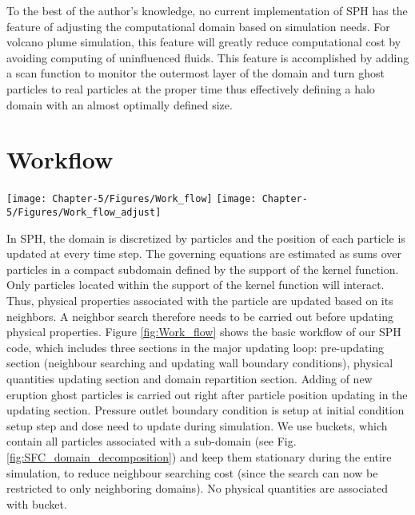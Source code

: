 To the best of the author's knowledge, no current implementation of SPH has the feature of adjusting the computational domain based on simulation needs. For volcano plume simulation, this feature will greatly reduce computational cost by avoiding computing of uninfluenced fluids. This feature is accomplished by adding a scan function to monitor the outermost layer of the domain and turn ghost particles to real particles at the proper time thus effectively defining a halo domain with an almost optimally defined size.

\section{Workflow}
\begin{figure*}[!t]
\centering
\texttt{[image: Chapter-5/Figures/Work\_flow]}
\hfil
\texttt{[image: Chapter-5/Figures/Work\_flow\_adjust]}
\caption{Workflow for SPH code. Figure to the left is the basic workflow. The right figure is the workflow that enables dynamic halo domain. These steps in orange box are newly added steps. Extra computational costs associated with these extra steps are discussed in section \ref{sec:effect-of-halo-domain}}
\label{fig:Work_flow}
\end{figure*}

In SPH, the domain is discretized by particles and the position of each particle is updated at every time step. The governing equations are estimated as sums over particles in a compact subdomain defined by the support of the kernel function. Only particles located within the support of the kernel function will interact. Thus, physical properties associated with the particle are updated based on its neighbors. A neighbor search therefore needs to be carried out before updating physical properties. Figure \ref{fig:Work_flow} shows the basic workflow of our SPH code, which includes three sections in the major updating loop: pre-updating section (neighbour searching and updating wall boundary conditions), physical quantities updating section and domain repartition section. Adding of new eruption ghost particles is carried out right after particle position updating in the updating section. Pressure outlet boundary condition is setup at initial condition setup step and dose need to update during simulation.
We use buckets, which contain all particles associated with a sub-domain (see Fig. \ref{fig:SFC_domain_decomposition}) 
and keep them stationary during the entire simulation, to reduce neighbour searching cost (since the search can now be restricted to only neighboring domains). No physical quantities are associated with bucket.

